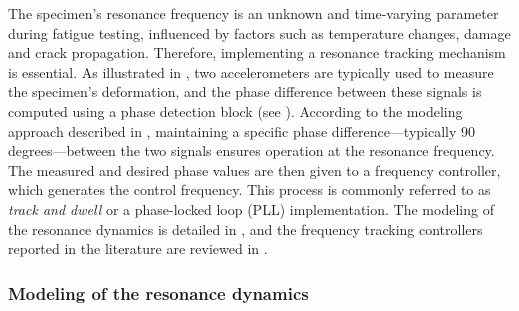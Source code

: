 \documentclass[preprint,12pt]{elsarticle}
\begin{document}
The specimen’s resonance frequency is an unknown and time-varying parameter during fatigue testing, influenced by factors such as temperature changes, damage and crack propagation. Therefore, implementing a resonance tracking mechanism is essential. As illustrated in , two accelerometers are typically used to measure the specimen’s deformation, and the phase difference between these signals is computed using a phase detection block (see ). According to the modeling approach described in , maintaining a specific phase difference—typically 90 degrees—between the two signals ensures operation at the resonance frequency. The measured and desired phase values are then given to a frequency controller, which generates the control frequency. This process is commonly referred to as {\em track and dwell} or a phase-locked loop (PLL) implementation. The modeling of the resonance dynamics is detailed in , and the frequency tracking controllers reported in the literature are reviewed in .



\subsubsection{Modeling of the resonance dynamics} \label{S_resonance_modeling}
\end{document}
